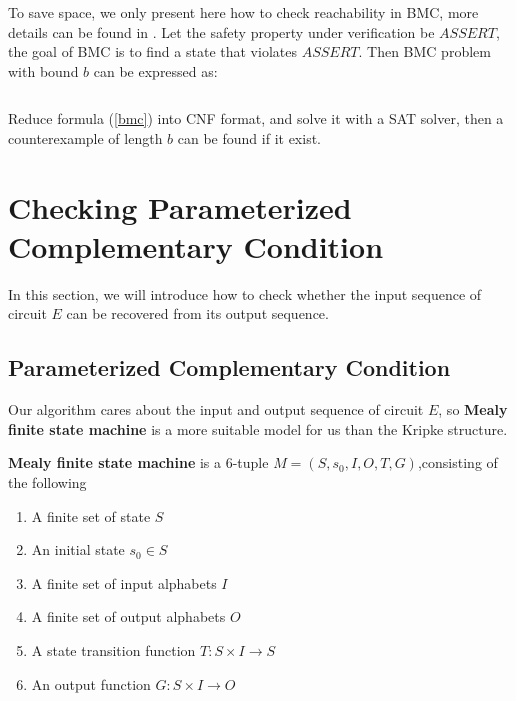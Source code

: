 \documentclass[journal]{IEEEtran}
\begin{document}
To save space,
we only present here how to check reachability in BMC,
more details can be found in \cite{SMCSAT}.
Let the safety property under verification be $ASSERT$,
the goal of BMC is to find a state that violates $ASSERT$.
Then BMC problem with bound $b$ can be expressed as:

\begin{equation}\label{bmc}
\end{equation}

Reduce formula (\ref{bmc}) into CNF format,
and solve it with a SAT solver,
then a counterexample of length $b$ can be found if it exist.

\section{Checking Parameterized Complementary Condition}\label{sec_checkUA}

In this section,
we will introduce how to check whether the input sequence of circuit $E$ can be recovered from its output sequence.

\subsection{Parameterized Complementary Condition}

Our algorithm cares about the input and output sequence of circuit $E$,
so \textbf{Mealy finite state machine}\cite{MEALY} is a more suitable model for us than the Kripke structure.

\vspace{0.2cm}

\begin{definition11}\label{MealyFSM}%
\textbf{Mealy finite state machine} is a 6-tuple $M=(S,s_0,I,O,T,G)$,consisting of the following
\begin{enumerate}
\item A finite set of state $S$
\item An initial state $s_0\in S$
\item A finite set of input alphabets $I$
\item A finite set of output alphabets $O$
\item A state transition function $T: S\times I\to S$
\item An output function $G:S\times I\to O$
\end{enumerate}
\end{definition11}
\end{document}
